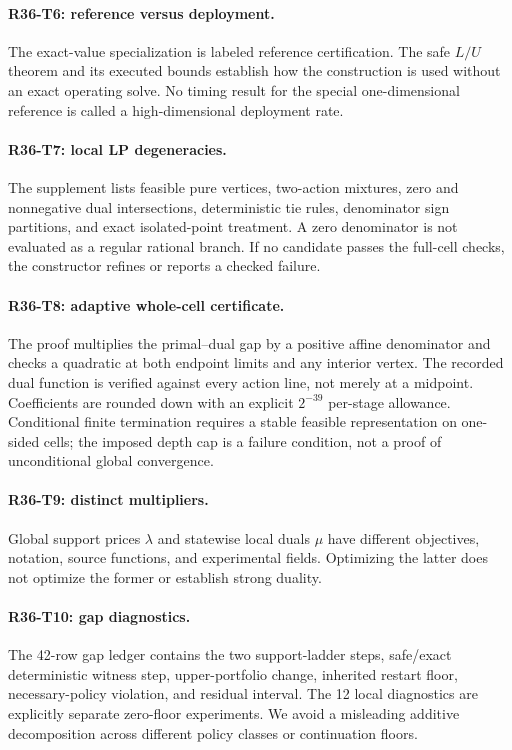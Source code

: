 \paragraph{R36-T6: reference versus deployment.} The exact-value specialization is labeled reference certification. The safe $L/U$ theorem and its executed bounds establish how the construction is used without an exact operating solve. No timing result for the special one-dimensional reference is called a high-dimensional deployment rate.

\paragraph{R36-T7: local LP degeneracies.} The supplement lists feasible pure vertices, two-action mixtures, zero and nonnegative dual intersections, deterministic tie rules, denominator sign partitions, and exact isolated-point treatment. A zero denominator is not evaluated as a regular rational branch. If no candidate passes the full-cell checks, the constructor refines or reports a checked failure.

\paragraph{R36-T8: adaptive whole-cell certificate.} The proof multiplies the primal--dual gap by a positive affine denominator and checks a quadratic at both endpoint limits and any interior vertex. The recorded dual function is verified against every action line, not merely at a midpoint. Coefficients are rounded down with an explicit $2^{-39}$ per-stage allowance. Conditional finite termination requires a stable feasible representation on one-sided cells; the imposed depth cap is a failure condition, not a proof of unconditional global convergence.

\paragraph{R36-T9: distinct multipliers.} Global support prices $\lambda$ and statewise local duals $\mu$ have different objectives, notation, source functions, and experimental fields. Optimizing the latter does not optimize the former or establish strong duality.

\paragraph{R36-T10: gap diagnostics.} The 42-row gap ledger contains the two support-ladder steps, safe/exact deterministic witness step, upper-portfolio change, inherited restart floor, necessary-policy violation, and residual interval. The 12 local diagnostics are explicitly separate zero-floor experiments. We avoid a misleading additive decomposition across different policy classes or continuation floors.

